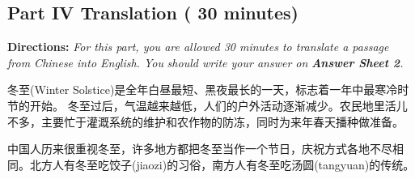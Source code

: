 \documentclass[UTF8,11pt]{ctexart}
\begin{document}
\subsection*{\textbf{Part IV Translation} \textbf{( 30 minutes)}}


\textbf{Directions: }\textit{For this part, you are allowed 30 minutes to translate a passage from Chinese into English. You} \textit{should write your answer on }\textbf{\textit{Answer Sheet 2}}\textit{.}


冬至(Winter Solstice)是全年白昼最短、黑夜最长的一天，标志着一年中最寒冷时节的开始。 冬至过后，气温越来越低，人们的户外活动逐渐减少。农民地里活儿不多，主要忙于灌溉系统的维护和农作物的防冻，同时为来年春天播种做准备。


中国人历来很重视冬至，许多地方都把冬至当作一个节日，庆祝方式各地不尽相同。北方人有冬至吃饺子(jiaozi)的习俗，南方人有冬至吃汤圆(tangyuan)的传统。
\end{document}
